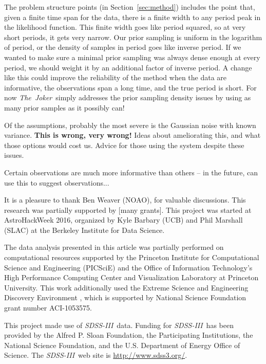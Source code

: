 \documentclass[manuscript, letterpaper]{aastex6}
\newcommand{\project}[1]{\textsl{#1}}
\newcommand{\acronym}[1]{{\small{#1}}}
\newcommand{\sdssiii}{\project{\acronym{SDSS-III}}}
\newcommand{\samplername}{\project{The~Joker}}
\newcommand{\sectionname}{Section}
\begin{document}
The problem structure points (in \sectionname~\ref{sec:method})
includes the point that, given a finite time span for the data, there
is a finite width to any period peak in the likelihood function.
This finite width goes like period squared, so at very short periods,
it gets very narrow.
Our prior sampling is uniform in the logarithm of period, or the
density of samples in period goes like inverse period.
If we wanted to make sure a minimal prior sampling was always dense
enough at every period, we should weight it by an additional factor of
inverse period.
A change like this could improve the reliability of the method when the data
are informative, the observations span a long time, and the true
period is short.
For now \samplername\ simply addresses the prior sampling density issues
by using as many prior samples as it possibly can!

Of the assumptions, probably the most severe is the Gaussian noise
with known variance. \textbf{This is wrong, very wrong!} Ideas about
ameliorating this, and what those options would cost us. Advice for
those using the system despite these issues.

Certain observations are much more informative than others -- in the future,
can use this to suggest observations...

\acknowledgements
It is a pleasure to thank
  Ben Weaver (NOAO),
for valuable discussions.
This research was partially supported by [many grants].
This project was started at AstroHackWeek 2016, organized by Kyle
Barbary (UCB) and Phil Marshall (SLAC) at the Berkeley Institute for
Data Science.

The data analysis presented in this article was partially performed on
computational resources supported by the Princeton Institute for Computational
Science and Engineering (PICSciE) and the Office of Information Technology's
High Performance Computing Center and Visualization Laboratory at Princeton
University.
This work additionally used the Extreme Science and Engineering Discovery
Environment \citep[XSEDE;][]{Towns:2014}, which is supported by National
Science Foundation grant number ACI-1053575.

This project made use of \sdssiii\ data. Funding for \sdssiii\ has been
provided by the Alfred P. Sloan Foundation, the Participating Institutions, the
National Science Foundation, and the \acronym{U.S.} Department of Energy Office
of Science. The \sdssiii\ web site is \url{http://www.sdss3.org/}.
\end{document}
